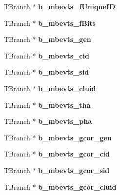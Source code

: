 \begin{DoxyCompactItemize}
\mbox{\label{classg__clx_ada0e05bae03e42e14c8e8494122a1709}} 
T\+Branch $\ast$ {\bfseries b\+\_\+mbevts\+\_\+f\+Unique\+ID}
\item 
\mbox{\label{classg__clx_ad19ba31973ff37f5351edf88f4dbf5aa}} 
T\+Branch $\ast$ {\bfseries b\+\_\+mbevts\+\_\+f\+Bits}
\item 
\mbox{\label{classg__clx_abfc7aed653b54224fb7ae61efd081de6}} 
T\+Branch $\ast$ {\bfseries b\+\_\+mbevts\+\_\+gen}
\item 
\mbox{\label{classg__clx_a4b7eebd7443d5a9058d4c21aca44e6bc}} 
T\+Branch $\ast$ {\bfseries b\+\_\+mbevts\+\_\+cid}
\item 
\mbox{\label{classg__clx_a80f356c60fe1eea5e82fcba16b4d482b}} 
T\+Branch $\ast$ {\bfseries b\+\_\+mbevts\+\_\+sid}
\item 
\mbox{\label{classg__clx_ae91752a1092e7b3ec6191515378fbd63}} 
T\+Branch $\ast$ {\bfseries b\+\_\+mbevts\+\_\+cluid}
\item 
\mbox{\label{classg__clx_a7c4dd347f0cf1856c3aaca6c77a3280a}} 
T\+Branch $\ast$ {\bfseries b\+\_\+mbevts\+\_\+tha}
\item 
\mbox{\label{classg__clx_ae9e6b4ef1483c136f08a0bd34ff3c98a}} 
T\+Branch $\ast$ {\bfseries b\+\_\+mbevts\+\_\+pha}
\item 
\mbox{\label{classg__clx_a272e88232977ef4a5537d35dea2abb53}} 
T\+Branch $\ast$ {\bfseries b\+\_\+mbevts\+\_\+gcor\+\_\+gen}
\item 
\mbox{\label{classg__clx_a3fd25e2237b246bfea4505b3df5f18f6}} 
T\+Branch $\ast$ {\bfseries b\+\_\+mbevts\+\_\+gcor\+\_\+cid}
\item 
\mbox{\label{classg__clx_ade7b131c7bdc5550ee4f7564a562ebbf}} 
T\+Branch $\ast$ {\bfseries b\+\_\+mbevts\+\_\+gcor\+\_\+sid}
\item 
\mbox{\label{classg__clx_ae23d5724733086d7e63dc3f69a5785ae}} 
T\+Branch $\ast$ {\bfseries b\+\_\+mbevts\+\_\+gcor\+\_\+cluid}

\end{DoxyCompactItemize}
